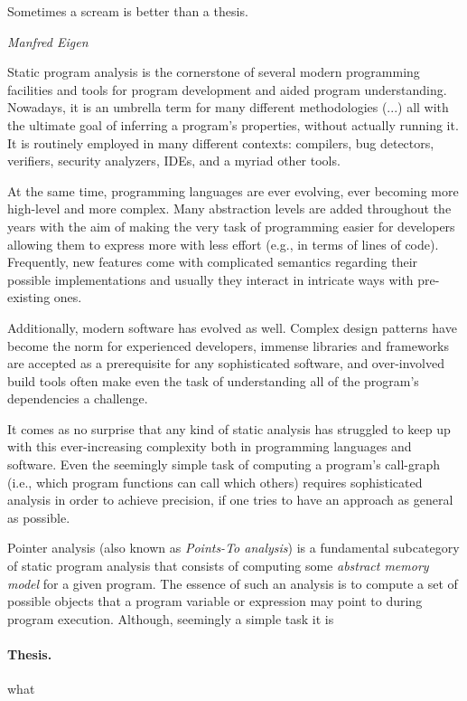 \label{chapter:intro}

\epigraph{Sometimes a scream is better than a thesis.}{\textit{Manfred Eigen}}

Static program analysis is the cornerstone of several modern programming facilities and tools for program development and aided program understanding. Nowadays, it is an umbrella term for many different methodologies (...) all with the ultimate goal of inferring a program's properties, without actually running it. It is routinely employed in many different contexts: compilers, bug detectors, verifiers, security analyzers, IDEs, and a myriad other tools.

At the same time, programming languages are ever evolving, ever becoming more high-level and more complex. Many abstraction levels are added throughout the years with the aim of making the very task of programming easier for developers allowing them to express more with less effort (e.g., in terms of lines of code). Frequently, new features come with complicated semantics regarding their possible implementations and usually they interact in intricate ways with pre-existing ones.

Additionally, modern software has evolved as well. Complex design patterns have become the norm for experienced developers, immense libraries and frameworks are accepted as a prerequisite for any sophisticated software, and over-involved build tools often make even the task of understanding all of the program's dependencies a challenge.

It comes as no surprise that any kind of static analysis has struggled to keep up with this ever-increasing complexity both in programming languages and software. Even the seemingly simple task of computing a program's call-graph (i.e., which program functions can call which others) requires sophisticated analysis in order to achieve precision, if one tries to have an approach as general as possible.

Pointer analysis (also known as \emph{Points-To analysis}) is a fundamental subcategory of static program analysis that consists of computing some \emph{abstract memory model} for a given program. The essence of such an analysis is to compute a set of possible objects that a program variable or expression may point to during program execution. Although, seemingly a simple task it is



\paragraph*{Thesis.}
\begin{displayquote}
what
\end{displayquote}